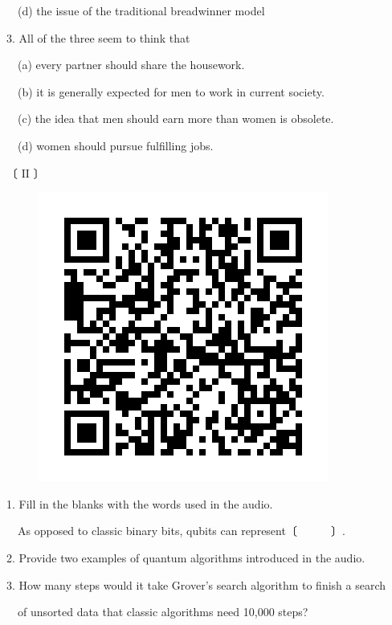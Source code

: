 \documentclass[12pt,a4paper,dvipdfmx]{jarticle}
\begin{document}
\begin{spacing}{1.5}
　(d) the issue of the traditional breadwinner model

3. All of the three seem to think that

　(a) every partner should share the housework.

　(b) it is generally expected for men to work in current society.

　(c) the idea that men should earn more than women is obsolete.

　(d) women should pursue fulfilling jobs.
 

 
\newpage

〔 $\mathrm{II}$ 〕

\vspace{3mm}
\begin{figure}[H]
\centering
\includegraphics[scale=0.2]{quantum.jpeg}
\end{figure}
\vspace{-1mm}

1. Fill in the blanks with the words used in the audio.　

　As opposed to classic binary bits, qubits can represent〔　　　〕.

\vspace{2mm}

2. Provide two examples of quantum algorithms introduced in the audio.

\vspace{2mm}

3. How many steps would it take Grover's search algorithm to finish a search

　of unsorted data that classic algorithms need 10,000 steps?


\end{spacing}
\end{document}
